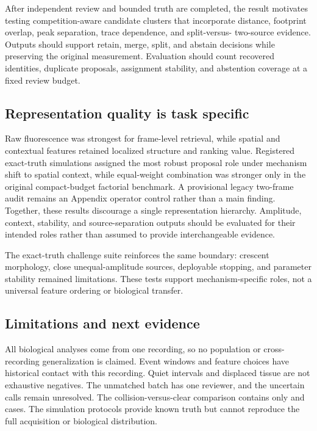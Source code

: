 After independent review and bounded truth are completed, the result motivates
testing competition-aware candidate clusters that incorporate
distance, footprint overlap, peak separation, trace dependence, and split-versus-
two-source evidence. Outputs should support retain, merge, split, and abstain
decisions while preserving the original measurement. Evaluation should count
recovered identities, duplicate proposals, assignment stability, and abstention
coverage at a fixed review budget.

\subsection{Representation quality is task specific}

Raw fluorescence was strongest for frame-level retrieval, while spatial and
contextual features retained localized structure and ranking value. Registered
exact-truth simulations assigned the most robust proposal role under mechanism
shift to spatial context, while equal-weight combination was stronger only in
the original compact-budget factorial benchmark. A provisional legacy
two-frame audit remains an Appendix operator control rather than a main finding.
Together, these results discourage a single representation hierarchy.
Amplitude, context, stability, and source-separation outputs should be evaluated
for their intended roles rather than assumed to provide interchangeable evidence.

The exact-truth challenge suite reinforces the same boundary: crescent
morphology, close unequal-amplitude sources, deployable stopping, and parameter
stability remained limitations. These tests support mechanism-specific roles,
not a universal feature ordering or biological transfer.

\subsection{Limitations and next evidence}

All biological analyses come from one recording, so no population or
cross-recording generalization is claimed. Event windows and feature choices have
historical contact with this recording. Quiet intervals and displaced tissue are
not exhaustive negatives. The unmatched batch has one reviewer, and the
\VenueReviewUncertain{} uncertain calls remain unresolved. The
collision-versus-clear comparison contains only \VenueIdentityCollision{} and
\VenueIdentityClear{} cases. The simulation protocols provide known truth but
cannot reproduce the full acquisition or biological distribution.

